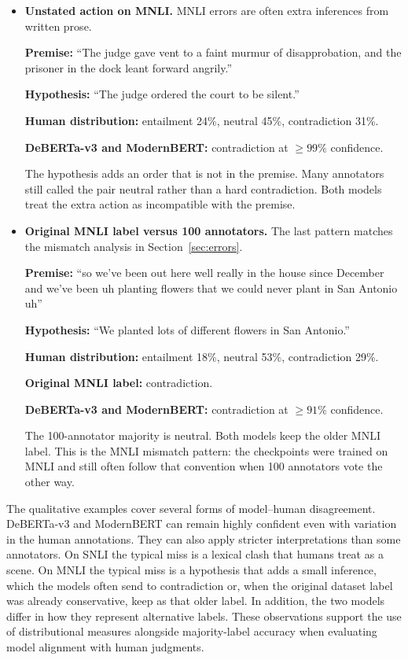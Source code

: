 \documentclass[11pt,a4paper]{article}
\begin{document}
\begin{itemize}[itemsep=0.5em, topsep=0.4em]
\item \textbf{Unstated action on MNLI.}
MNLI errors are often extra inferences from written prose.

\textbf{Premise:} ``The judge gave vent to a faint murmur of disapprobation, and the prisoner in the dock leant forward angrily.''

\textbf{Hypothesis:} ``The judge ordered the court to be silent.''

\textbf{Human distribution:} entailment 24\%, neutral 45\%, contradiction 31\%.

\textbf{DeBERTa-v3 and ModernBERT:} contradiction at $\geq 99\%$ confidence.

The hypothesis adds an order that is not in the premise. Many annotators still called the pair neutral rather than a hard contradiction. Both models treat the extra action as incompatible with the premise.

\item \textbf{Original MNLI label versus 100 annotators.}
The last pattern matches the mismatch analysis in Section~\ref{sec:errors}.

\textbf{Premise:} ``so we've been out here well really in the house since December and we've been uh planting flowers that we could never plant in San Antonio uh''

\textbf{Hypothesis:} ``We planted lots of different flowers in San Antonio.''

\textbf{Human distribution:} entailment 18\%, neutral 53\%, contradiction 29\%.

\textbf{Original MNLI label:} contradiction.

\textbf{DeBERTa-v3 and ModernBERT:} contradiction at $\geq 91\%$ confidence.

The 100-annotator majority is neutral. Both models keep the older MNLI label. This is the MNLI mismatch pattern: the checkpoints were trained on MNLI and still often follow that convention when 100 annotators vote the other way.

\end{itemize}

The qualitative examples cover several forms of model--human disagreement. DeBERTa-v3 and ModernBERT can remain highly confident even with variation in the human annotations. They can also apply stricter interpretations than some annotators. On SNLI the typical miss is a lexical clash that humans treat as a scene. On MNLI the typical miss is a hypothesis that adds a small inference, which the models often send to contradiction or, when the original dataset label was already conservative, keep as that older label. In addition, the two models differ in how they represent alternative labels. These observations support the use of distributional measures alongside majority-label accuracy when evaluating model alignment with human judgments.
\end{document}
